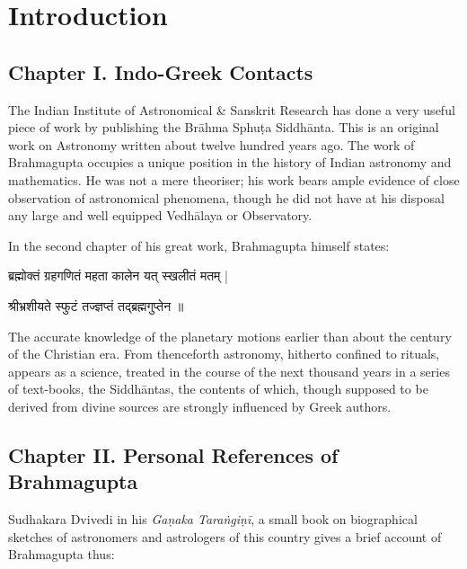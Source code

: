 \documentclass[11pt,a4paper]{article}
\begin{document}
\clearpage

\section*{Introduction}

\subsection*{Chapter I. Indo-Greek Contacts}

The Indian Institute of Astronomical \& Sanskrit Research has done a very useful piece of work by publishing the Br\=ahma Sphu\d ta Siddh\=anta. This is an original work on Astronomy written about twelve hundred years ago. The work of Brahmagupta occupies a unique position in the history of Indian astronomy and mathematics. He was not a mere theoriser; his work bears ample evidence of close observation of astronomical phenomena, though he did not have at his disposal any large and well equipped Vedh\=alaya or Observatory.

In the second chapter of his great work, Brahmagupta himself states:
{\devanagarifont ब्रह्मोक्तं ग्रहगणितं महता कालेन यत् स्खलीतं मतम् |\par}
{\devanagarifont श्रीभ्रशीयते स्फुटं तज्ज्ञप्तं तद्ब्रह्मगुप्तेन ॥\par}

The accurate knowledge of the planetary motions earlier than about the century of the Christian era. From thenceforth astronomy, hitherto confined to rituals, appears as a science, treated in the course of the next thousand years in a series of text-books, the Siddh\=antas, the contents of which, though supposed to be derived from divine sources are strongly influenced by Greek authors.

\subsection*{Chapter II. Personal References of Brahmagupta}

Sudhakara Dvivedi in his \textit{Gaṇaka Taraṅgiṇī}, a small book on biographical sketches of astronomers and astrologers of this country gives a brief account of Brahmagupta thus:
\end{document}

